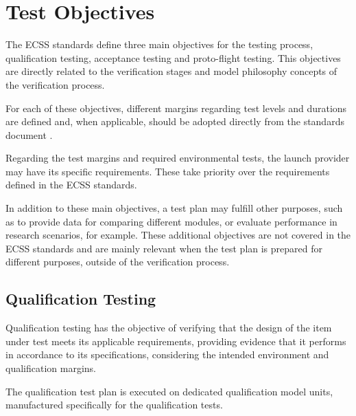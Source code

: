 %
%
%
%
%

%
%
%
%
%

\chapter{Test Objectives} \label{ch:test-objectives}

The ECSS standards \cite{ecss-e-st-10-03} define three main objectives for the testing process, qualification testing, acceptance testing and proto-flight testing.
This objectives are directly related to the verification stages and model philosophy concepts of the verification process.

For each of these objectives, different margins regarding test levels and durations are defined and, when applicable, should be adopted directly from the standards document \cite{ecss-e-st-10-03}.

Regarding the test margins and required environmental tests, the launch provider may have its specific requirements. These take priority over the requirements defined in the ECSS standards.

In addition to these main objectives, a test plan may fulfill other purposes, such as to provide data for comparing different modules, or evaluate performance in research scenarios, for example.
These additional objectives are not covered in the ECSS standards and are mainly relevant when the test plan is prepared for different purposes, outside of the verification process.

\section{Qualification Testing}

Qualification testing has the objective of verifying that the design of the item under test meets its applicable requirements, providing evidence that it performs in accordance to its specifications, considering the intended environment and qualification margins.

The qualification test plan is executed on dedicated qualification model units, manufactured specifically for the qualification tests.



